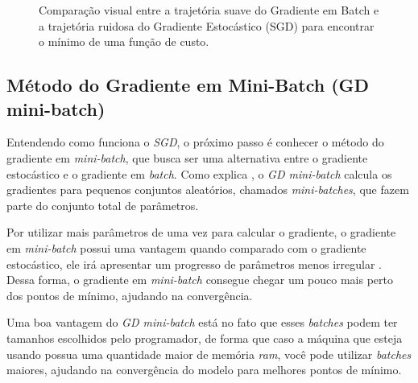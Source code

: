 \begin{figure}[h!]
    \caption{Comparação visual entre a trajetória suave do Gradiente em Batch e a trajetória ruidosa do Gradiente Estocástico (SGD) para encontrar o mínimo de uma função de custo.}
    \label{fig:comparativo-gd-sgd}
\end{figure}

\subsection{Método do Gradiente em Mini-Batch (GD mini-batch)} 

Entendendo como funciona o \textit{SGD}, o próximo passo é conhecer o método do gradiente em \textit{mini-batch}, que busca ser uma alternativa entre o gradiente estocástico e o gradiente em \textit{batch}. Como explica \textcite{MaosAObra}, o \textit{GD mini-batch} calcula os gradientes para pequenos conjuntos aleatórios, chamados \textit{mini-batches}, que fazem parte do conjunto total de parâmetros.

Por utilizar mais parâmetros de uma vez para calcular o gradiente, o gradiente em \textit{mini-batch} possui uma vantagem quando comparado com o gradiente estocástico, ele irá apresentar um progresso de parâmetros menos irregular \parencite{MaosAObra}. Dessa forma, o gradiente em \textit{mini-batch} consegue chegar um pouco mais perto dos pontos de mínimo, ajudando na convergência.

Uma boa vantagem do \textit{GD mini-batch} está no fato que esses \textit{batches} podem ter tamanhos escolhidos pelo programador, de forma que caso a máquina que esteja usando possua uma quantidade maior de memória \textit{ram}, você pode utilizar \textit{batches} maiores, ajudando na convergência do modelo para melhores pontos de mínimo.

